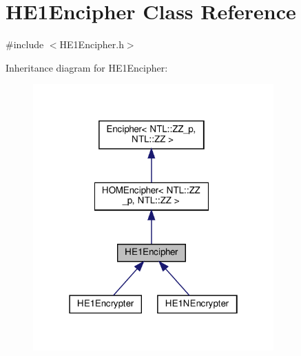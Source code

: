 \hypertarget{classHE1Encipher}{}\section{H\+E1\+Encipher Class Reference}
\label{classHE1Encipher}


{\ttfamily \#include $<$H\+E1\+Encipher.\+h$>$}



Inheritance diagram for H\+E1\+Encipher\+:\nopagebreak
\begin{figure}[H]
\begin{center}
\leavevmode
\includegraphics[width=262pt]{classHE1Encipher__inherit__graph}
\end{center}
\end{figure}


